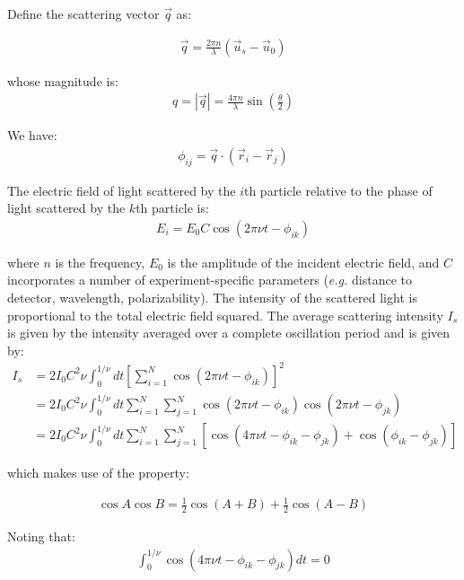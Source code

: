 \documentclass[book.tex]{subfiles}
\begin{document}
Define the scattering vector $\vec{q}$ as:

\begin{align}\label{Eq13}
\vec{q} = \frac{2\pi n}{\lambda}(\vec{u}_s - \vec{u}_0)
\end{align}

\noindent whose magnitude is:
\begin{align}\label{Eq14}
q = |\vec{q}| = \frac{4\pi n}{\lambda}\sin\left(\frac{\theta}{2}\right)
\end{align}

We have:
\begin{align}\label{15}
\phi_{ij} = \vec{q}\cdot (\vec{r}_i - \vec{r}_j)
\end{align}

The electric field of light scattered by the $i$th particle relative to the phase of light scattered by the $k$th particle is:
\begin{align}\label{Eq16}
E_i = E_0C \cos(2\pi\nu t - \phi _{ik})
\end{align}

\noindent where $n$ is the frequency, $E_0$ is the amplitude of the incident electric field, and $C$ incorporates a number of experiment-specific parameters (\textit{e.g.} distance to detector, wavelength, polarizability).
The intensity of the scattered light is proportional to the total electric field squared. The average scattering intensity $I_s$ is given by the intensity averaged over a complete oscillation period and is given by:
\begin{align}\label{Eq17}
I_s &= 2I_0C^2\nu\int_0^{1/\nu}dt\left[ \sum_{i=1}^N\cos(2\pi\nu t - \phi_{ik}) \right]^2 \\
&= 2I_0C^2\nu\int_0^{1/\nu}dt \sum_{i=1}^N \sum_{j=1}^N\cos(2\pi\nu t - \phi_{ik})\cos(2\pi\nu t - \phi_{jk}) \\
&= 2I_0C^2\nu\int_0^{1/\nu}dt \sum_{i=1}^N \sum_{j=1}^N[\cos(4\pi\nu t - \phi_{ik}- \phi_{jk}) + \cos(\phi_{ik}- \phi_{jk})]
\end{align}

\noindent which makes use of the property:

\begin{align}\label{Eq18}
\cos A \cos B = \frac{1}{2}\cos(A + B) + \frac{1}{2}\cos (A- B)
\end{align}

Noting that:
\begin{align}\label{Eq19}
\int_0^{1/\nu}\cos(4\pi\nu t - \phi_{ik} - \phi_{jk}) dt =0
\end{align}
\end{document}

